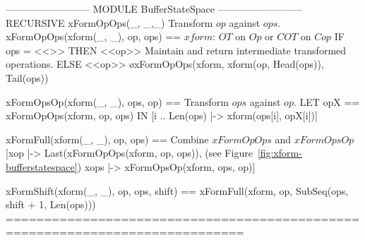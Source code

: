 \documentclass{article}
\begin{document}
\begin{tla}
-------------------------- MODULE BufferStateSpace --------------------------
RECURSIVE xFormOpOps(_, _,_) \* Transform $op$ against $ops$. 
xFormOpOps(xform(_, _), op, ops) == \* $xform$: $OT$ on $Op$ or $COT$ on $Cop$
    IF ops = <<>> THEN <<op>> \* Maintain and return intermediate transformed operations.
    ELSE <<op>> \o xFormOpOps(xform, xform(op, Head(ops)), Tail(ops))

xFormOpsOp(xform(_, _), ops, op) == \* Transform $ops$ against $op$.
    LET opX == xFormOpOps(xform, op, ops)
    IN  [i  .. Len(ops) |-> xform(ops[i], opX[i])]

xFormFull(xform(_, _), op, ops) == \* Combine $xFormOpOps$ and $xFormOpsOp$
    [xop |-> Last(xFormOpOps(xform, op, ops)), \* (see Figure~\ref{fig:xform-bufferstatespace})
    xops |-> xFormOpsOp(xform, ops, op)]

xFormShift(xform(_, _), op, ops, shift) == 
    xFormFull(xform, op, SubSeq(ops, shift + 1, Len(ops)))
=============================================================================
\end{tla}
\end{document}
